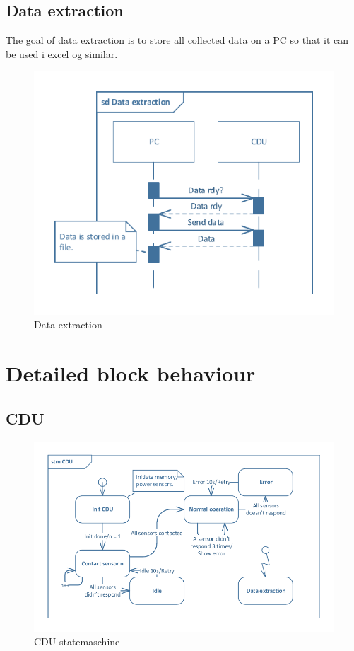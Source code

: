 \subsection{Data extraction}
The goal of data extraction is to store all collected data on a PC so that it can be used i excel og similar.

\begin{figure}[hbpt]
\centering
\includegraphics[width=.6\textwidth]{billeder/data_extraction_sd}
\caption{Data extraction}
\end{figure}

\section{Detailed block behaviour}

\subsection{CDU}

\begin{figure}[hbpt]
\centering
\includegraphics[width=.8\textwidth]{billeder/CDU_STM}
\caption{CDU statemaschine}
\end{figure}